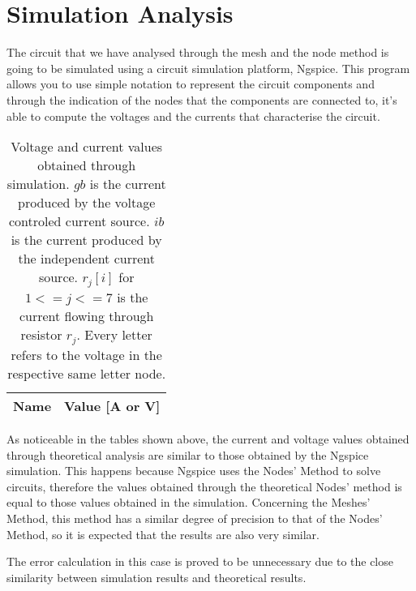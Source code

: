 \section{Simulation Analysis}
\label{sec:simulation}

The circuit that we have analysed through the mesh and the node method is going to be simulated using a circuit simulation platform, Ngspice. This program allows you to use simple notation to represent the circuit components and through the indication of the nodes that the components are connected to, it's able to compute the voltages and the currents that characterise the circuit.

\begin{table}[h]
  \centering
  \begin{tabular}{|l|r|}
    \hline    
    {\bf Name} & {\bf Value [A or V]} \\ \hline
    
  \end{tabular}
  \caption{Voltage and current values obtained through simulation. $gb$ is the current produced by the voltage controled current source. $ib$ is the current produced by the independent current source. $r_j[i]$ for $1<=j<=7$ is the current flowing through resistor $r_j$. Every letter refers to the voltage in the respective same letter node.}
  \label{tab:op}
\end{table}


As noticeable in the tables shown above, the current and voltage values obtained through theoretical analysis are similar to those obtained by the Ngspice simulation. This happens because Ngspice uses the Nodes' Method to solve circuits, therefore the values obtained through the theoretical Nodes' method is equal to those values obtained in the simulation. Concerning the Meshes' Method, this method has a similar degree of precision to that of the Nodes' Method, so it is expected that the results are also very similar.

The error calculation in this case is proved to be unnecessary due to the close similarity between simulation results and theoretical results.
